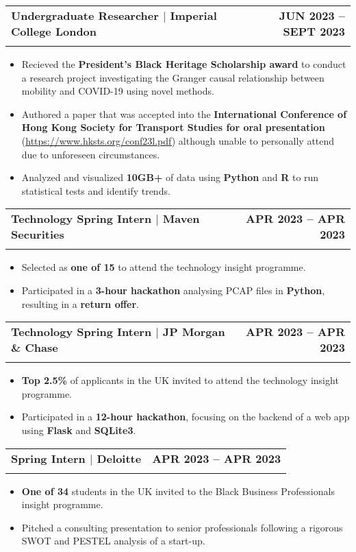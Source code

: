 \documentclass[a4paper,11pt]{article}
\makeatletter
\newcommand{\resumeItem}[1]{
  \item\small{
    {#1 \vspace{-2pt}}
  }
}
\newcommand{\resumeSubheading}[4]{
  \vspace{-2pt}\item
    \begin{tabular*}{\textwidth}[t]{l@{\extracolsep{\fill}}r}
      \textbf{#1} & \textbf{#2} \\
      \textit{\small#3} & \textit{\small #4} \\
    \end{tabular*}\vspace{-7pt}
}
\newcommand{\resumeItemListStart}{\begin{itemize}}
\newcommand{\resumeItemListEnd}{\end{itemize}\vspace{-5pt}}
\makeatother
\begin{document}
      \resumeSubheading
      {Undergraduate Researcher $|$ Imperial College London}{JUN 2023 -- SEPT 2023}
      {}{}
      \resumeItemListStart
        \vspace{-4mm}
        \resumeItem{Recieved the \textbf{President's Black Heritage Scholarship award} to conduct a research project investigating the Granger causal relationship between mobility and COVID-19 using novel methods.}
        \resumeItem{Authored a paper that was accepted into the \textbf{International Conference of Hong Kong Society for Transport Studies for oral presentation} (\href{https://www.hksts.org/conf23l.pdf}{\underline{https://www.hksts.org/conf23l.pdf}}) although unable to personally attend due to unforeseen circumstances.}
        \resumeItem{Analyzed and visualized \textbf{10GB+} of data using \textbf{Python} and \textbf{R} to run statistical tests and identify trends.}
      \resumeItemListEnd

      \resumeSubheading
      {Technology Spring Intern $|$ Maven Securities}{APR 2023 -- APR 2023}
      {}{}
      \resumeItemListStart
        \vspace{-4mm}
        \resumeItem{Selected as \textbf{one of 15} to attend the technology insight programme.}
        \resumeItem{Participated in a \textbf{3-hour hackathon} analysing PCAP files in \textbf{Python}, resulting in a \textbf{return offer}.}
      \resumeItemListEnd

      \resumeSubheading
      {Technology Spring Intern $|$ JP Morgan \& Chase}{APR 2023 -- APR 2023}
      {}{}
      \resumeItemListStart
        \vspace{-4mm}
        \resumeItem{\textbf{Top 2.5\%} of applicants in the UK invited to attend the technology insight programme.}
        \resumeItem{Participated in a \textbf{12-hour hackathon}, focusing on the backend of a web app using \textbf{Flask} and \textbf{SQLite3}.}
    
      \resumeItemListEnd

      \resumeSubheading
      {Spring Intern $|$ Deloitte}{APR 2023 -- APR 2023}
      {}{}
      \resumeItemListStart
        \vspace{-4mm}
        \resumeItem{\textbf{One of 34} students in the UK invited to the Black Business Professionals insight programme.}
        \resumeItem{Pitched a consulting presentation to senior professionals following a rigorous SWOT and PESTEL analysis of a start-up.}
    
      \resumeItemListEnd
\end{document}
